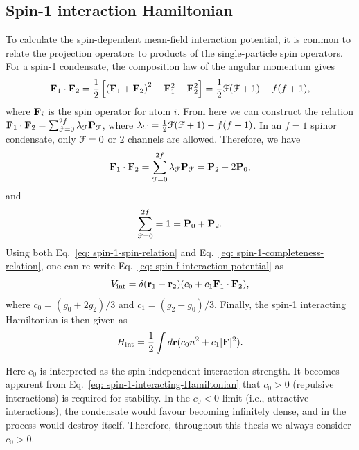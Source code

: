 \subsection{Spin-1 interaction Hamiltonian}
To calculate the spin-dependent mean-field interaction potential, it is common
to relate the projection operators to products of the single-particle spin
operators.
For a spin-1 condensate, the composition law of the angular momentum
gives~\cite{Kawaguchi2012, StamperKurn2013}
\begin{equation}\label{eq: composition-law}
    \vb{F}_1 \cdot \vb{F}_2 = \frac{1}{2}\left[{(\vb{F}_1 + \vb{F}_2)}^2
    - \vb{F}_1^2 - \vb{F}_2^2\right] = \frac{1}{2}\EuScript{F}(\EuScript{F} + 1)
    -f(f+1),
\end{equation}
where \(\vb{F}_i\) is the spin operator for atom \(i\).
From here we can construct the relation \(\vb{F}_1 \cdot \vb{F}_2 = 
\sum_{\EuScript{F} = 0}^{2f}\lambda_\EuScript{F}\vb{P}_\EuScript{F}\), where
\(\lambda_\EuScript{F} = \frac{1}{2}\EuScript{F}(\EuScript{F} + 1)
-f(f+1)\).
In an \(f=1\) spinor condensate, only \(\EuScript{F} = 0\) or \(2\) channels
are allowed.
Therefore, we have
\begin{equation}\label{eq: spin-1-spin-relation}
    \vb{F}_1 \cdot \vb{F}_2 = \sum_{\EuScript{F} = 0}^{2f}
    \lambda_\EuScript{F}\vb{P}_\EuScript{F} = \vb{P}_2 - 2\vb{P}_0,
\end{equation}
and
\begin{equation}\label{eq: spin-1-completeness-relation}
    \sum_{\EuScript{F} = 0}^{2f} = 1 = \vb{P}_0 + \vb{P}_2.
\end{equation}
Using both Eq.~\eqref{eq: spin-1-spin-relation} and
Eq.~\eqref{eq: spin-1-completeness-relation}, one can re-write
Eq.~\eqref{eq: spin-f-interaction-potential} as
\begin{equation}
    V_\mathrm{int} = \delta(\vb{r}_1 - \vb{r}_2)
    (c_0 + c_1 \vb{F}_1 \cdot \vb{F}_2),
\end{equation}
where \(c_0 = (g_0+2g_2)/3\) and \(c_1=(g_2-g_0) / 3\).
Finally, the spin-1 interacting Hamiltonian is then given as
\begin{equation}\label{eq: spin-1-interacting-Hamiltonian}
    H_\mathrm{int} = \frac{1}{2}\int d\vb{r} (c_0n^2 + c_1|\vb{F}|^2).
\end{equation}

Here \(c_0\) is interpreted as the spin-independent interaction strength.
It becomes apparent from Eq.~\ref{eq: spin-1-interacting-Hamiltonian} that
\(c_0 > 0\) (repulsive interactions) is required for stability.
In the \(c_0 < 0\) limit (i.e., attractive interactions), the condensate would
favour becoming infinitely dense, and in the process would destroy itself.
Therefore, throughout this thesis we always consider \(c_0 > 0\).

